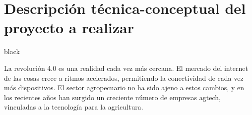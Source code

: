 \documentclass[11pt]{charter}
\begin{document}
\section{Descripción técnica-conceptual del proyecto a realizar}
\label{sec:descripcion}

\begin{consigna}{black}




La revolución 4.0 es una realidad cada vez más cercana. El mercado del internet de las cosas crece a ritmos acelerados, permitiendo la conectividad de cada vez más dispositivos. El sector agropecuario no ha sido ajeno a estos cambios, y en los recientes años han surgido un creciente número de empresas agtech, vinculadas a la tecnología para la agricultura.


\end{consigna}
\end{document}
